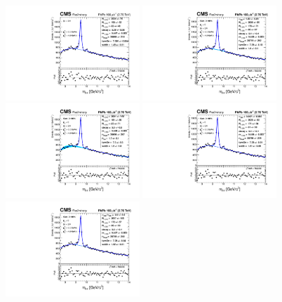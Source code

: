 \begin{figure}
\begin{center}
  \includegraphics[width=0.45\textwidth]{Chapters/aYield/PbPb/pt_3p5_4/Rap/Rap_0_2p4/PbPb_Rap_0_2p4_fsr1.pdf}
  \includegraphics[width=0.45\textwidth]{Chapters/aYield/PbPb/pt_3p5_4/Centrality/Cent_0_100/PbPb_Cent_0_100_fsr2.pdf}
  \includegraphics[width=0.45\textwidth]{Chapters/aYield/PbPb/pt_3p5_4/Centrality/Cent_0_100/PbPb_Cent_0_100_fsr3.pdf}
  \includegraphics[width=0.45\textwidth]{Chapters/aYield/PbPb/pt_3p5_4/Centrality/Cent_0_100/PbPb_Cent_0_100_fsr4.pdf}
  \includegraphics[width=0.45\textwidth]{Chapters/aYield/PbPb/pt_3p5_4/Centrality/Cent_0_100/PbPb_Cent_0_100_fsr5.pdf}

\end{center}
\end{figure}
